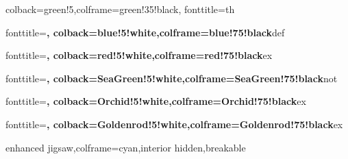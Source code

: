 
\theoremstyle{normalit}
\newtheorem{theorem}{Theorem}[section]
\newtheorem{lemma}{Lemma}[section]
\newtheorem{corollary}{Corollary}[section]
\newtheorem{proposition}{Proposition}[section]
\newtheorem*{theorem*}{Theorem}

\theoremstyle{thmit}
\newtheorem*{solution}{Solution}
\newtheorem*{fsolution}{Solution}

\theoremstyle{normal}
\newtheorem{example}{Example}[section]
\newtheorem{definition}{Definition}[section]
\newtheorem{problem}{Problem}[section]
\newtheorem{question}{Question}[section]
\newtheorem{remark}{Remark}[section]
\newtheorem{properties}{Properties}[section]
\newtheorem{notation}{Notation}[section]
\newtheorem{axiom}{Axiom}[section]
\newtheorem*{properties*}{Properties}
\newtheorem*{remark*}{Remark}
\newtheorem*{definition*}{Definition}
\theoremstyle{plain}

%
    {colback=green!5,colframe=green!35!black,
     fonttitle=\bfseries\upshape}{th}

%
    {fonttitle=\bfseries\upshape,
     colback=blue!5!white,colframe=blue!75!black}{def}

%
    {fonttitle=\bfseries\upshape,
     colback=red!5!white,colframe=red!75!black}{ex}

%
    {fonttitle=\bfseries\upshape,
     colback=SeaGreen!5!white,colframe=SeaGreen!75!black}{not}

%
    {fonttitle=\bfseries\upshape,
     colback=Orchid!5!white,colframe=Orchid!75!black}{ex}

%
    {fonttitle=\bfseries\upshape,
     colback=Goldenrod!5!white,colframe=Goldenrod!75!black}{ex}

\newenvironment{bproof}{\textit{Proof.}}{\hfill$\square$}
    {enhanced jigsaw,colframe=cyan,interior hidden,breakable}

